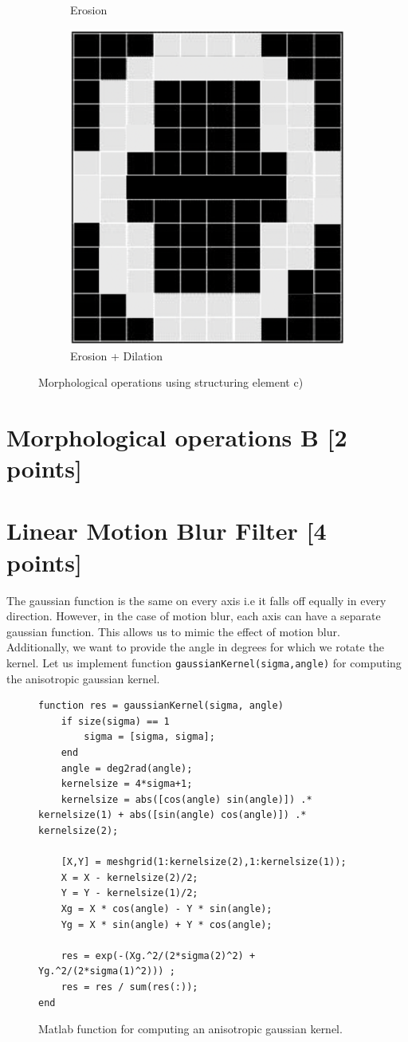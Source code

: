\documentclass[tikz,14pt,fleqn]{article}
\begin{document}
\begin{figure}[h!]
\begin{subfigure}[b]{0.33\linewidth}
        \caption{Erosion}
    \end{subfigure}
    \begin{subfigure}[b]{0.33\linewidth}
        \centering
        \includegraphics[width=.5\linewidth]{fig/3.2.png}
        \caption{Erosion + Dilation}
    \end{subfigure}
    \caption{Morphological operations using structuring element c)}
    \label{fig:3}
\end{figure}
\section{Morphological operations B [2 points]}

\section{Linear Motion Blur Filter [4 points]}
The gaussian function is the same on every axis i.e it falls off equally in every direction. However, in the case of motion blur, each axis can have a separate gaussian function. This allows us to mimic the effect of motion blur.\\
Additionally, we want to provide the angle in degrees for which we rotate the kernel. Let us implement function \texttt{gaussianKernel(sigma,angle)} for computing the anisotropic gaussian kernel.
\begin{figure}[h!]
\begin{verbatim} 
function res = gaussianKernel(sigma, angle)
    if size(sigma) == 1
        sigma = [sigma, sigma];
    end
    angle = deg2rad(angle);
    kernelsize = 4*sigma+1;
    kernelsize = abs([cos(angle) sin(angle)]) .* kernelsize(1) + abs([sin(angle) cos(angle)]) .* kernelsize(2);

    [X,Y] = meshgrid(1:kernelsize(2),1:kernelsize(1));
    X = X - kernelsize(2)/2; 
    Y = Y - kernelsize(1)/2;
    Xg = X * cos(angle) - Y * sin(angle);
    Yg = X * sin(angle) + Y * cos(angle);

    res = exp(-(Xg.^2/(2*sigma(2)^2) + Yg.^2/(2*sigma(1)^2))) ;
    res = res / sum(res(:));
end
\end{verbatim}
\caption{Matlab function for computing an anisotropic gaussian kernel.}
\end{figure}
\end{document}
